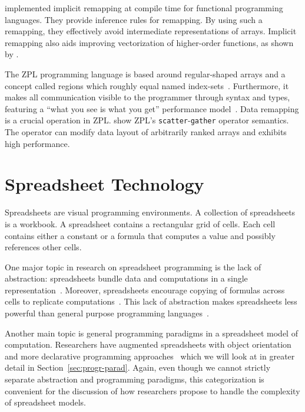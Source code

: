 \documentclass[a4paper]{article}
\begin{document}
\citet{Walinsky:1990:FPL:91556.91610} implemented implicit remapping at compile time for functional programming languages. They provide inference rules for remapping. By using such a remapping, they effectively avoid intermediate representations of arrays. Implicit remapping also aids improving vectorization of higher-order functions, as shown by \citet{Sinkarovs:2013:SDL:2502323.2502332}.

The ZPL programming language is based around regular-shaped arrays and a concept called regions which roughly equal named index-sets~\cite{Chamberlain1999Regions}. Furthermore, it makes all communication visible to the programmer through syntax and types, featuring a ``what you see is what you get'' performance model~\cite{Chamberlain1998ZPLs}. Data remapping is a crucial operation in ZPL.\@ \citet{Deitz:2003:DIP:781498.781526} show ZPL's \texttt{scatter}-\texttt{gather} operator semantics. The operator can modify data layout of arbitrarily ranked arrays and exhibits high performance.

\section{Spreadsheet Technology}
\label{sec:spreadsheet-end-user-dev}

Spreadsheets are visual programming environments. A collection of spreadsheets is a workbook. A spreadsheet contains a rectangular grid of cells. Each cell contains either a constant or a formula that computes a value and possibly references other cells.

One major topic in research on spreadsheet programming is the lack of abstraction: spreadsheets bundle data and computations in a single representation~\cite{Isakowitz:1995:TLT:195705.195708}. Moreover, spreadsheets encourage copying of formulas across cells to replicate computations~\cite{1173080, Benfield:2009:FFD:1668113.1668121}. This lack of abstraction makes spreadsheets less powerful than general purpose programming languages~\cite{Miller:2015:SPB:2814189.2814201}.

Another main topic is general programming paradigms in a spreadsheet model of computation. Researchers have augmented spreadsheets with object orientation~\cite{Benfield:2009:FFD:1668113.1668121} and more declarative programming approaches~\cite{Stadelmann:1993:SBC:168642.168664, Singh:2016:TSD:2837614.2837668} which we will look at in greater detail in Section~\ref{sec:progr-parad}. Again, even though we cannot strictly separate abstraction and programming paradigms, this categorization is convenient for the discussion of how researchers propose to handle the complexity of spreadsheet models.
\end{document}
